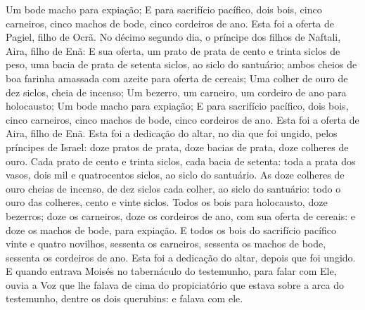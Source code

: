 {  Um bode macho para expiação;
  E para sacrifício pacífico, dois bois, cinco carneiros, cinco machos de bode, cinco cordeiros de ano. Esta foi a oferta de Pagiel, filho de Ocrã.
  No décimo segundo dia, o príncipe dos filhos de Naftali, Aira, filho de Enã:
  E sua oferta, um prato de prata de cento e trinta siclos de peso, uma bacia de prata de setenta siclos, ao siclo do santuário; ambos cheios de boa farinha amassada com azeite para oferta de cereais;
  Uma colher de ouro de dez siclos, cheia de incenso;
  Um bezerro, um carneiro, um cordeiro de ano para holocausto;
  Um bode macho para expiação;
  E para sacrifício pacífico, dois bois, cinco carneiros, cinco machos de bode, cinco cordeiros de ano. Esta foi a oferta de Aira, filho de Enã.
  Esta foi a dedicação do altar, no dia que foi ungido, pelos príncipes de Israel: doze pratos de prata, doze bacias de prata, doze colheres de ouro.
  Cada prato de cento e trinta siclos, cada bacia de setenta: toda a prata dos vasos, dois mil e quatrocentos siclos, ao siclo do santuário.
  As doze colheres de ouro cheias de incenso, de dez siclos cada colher, ao siclo do santuário: todo o ouro das colheres, cento e vinte siclos.
  Todos os bois para holocausto, doze bezerros; doze os carneiros, doze os cordeiros de ano, com sua oferta de cereais: e doze os machos de bode, para expiação.
  E todos os bois do sacrifício pacífico vinte e quatro novilhos, sessenta os carneiros, sessenta os machos de bode, sessenta os cordeiros de ano. Esta foi a dedicação do altar, depois que foi ungido.
  E quando entrava Moisés no tabernáculo do testemunho, para falar com Ele, ouvia a Voz que lhe falava de cima do propiciatório que estava sobre a arca do testemunho, dentre os dois querubins: e falava com ele.
\par }

